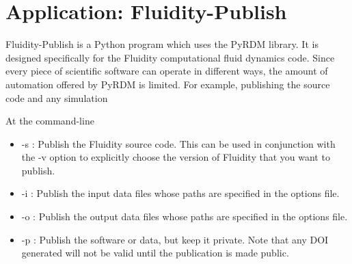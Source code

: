 \documentclass[a4paper,11pt]{report}
\begin{document}
\chapter{Application: Fluidity-Publish}
Fluidity-Publish is a Python program which uses the PyRDM library. It is designed specifically for the Fluidity computational fluid dynamics code. Since every piece of scientific software can operate in different ways, the amount of automation offered by PyRDM is limited. For example,  publishing the source code and any simulation 

At the command-line

\begin{itemize}
   \item -s : Publish the Fluidity source code. This can be used in conjunction with the -v option to explicitly choose the version of Fluidity that you want to publish.
   \item -i : Publish the input data files whose paths are specified in the options file.
   \item -o : Publish the output data files whose paths are specified in the options file.
   \item -p : Publish the software or data, but keep it private. Note that any DOI generated will not be valid until the publication is made public.
\end{itemize}
\end{document}
